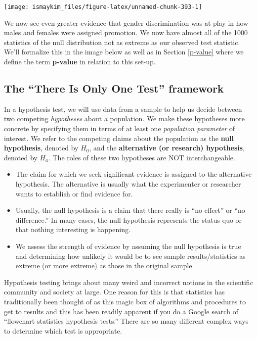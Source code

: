 \documentclass[12pt, krantz2,]{krantz}
\providecommand{\tightlist}{%
  \setlength{\itemsep}{0pt}\setlength{\parskip}{0pt}}
\begin{document}
\begin{center}\texttt{[image: ismaykim\_files/figure-latex/unnamed-chunk-393-1]} \end{center}

We now see even greater evidence that gender discrimination was at play in how males and females were assigned promotion. We now have almost all of the 1000 statistics of the null distribution not as extreme as our observed test statistic. We'll formalize this in the image below as well as in Section \ref{p-value} where we define the term \textbf{p-value} in relation to this set-up.

\hypertarget{only-one-test}{%
\subsection{The ``There Is Only One Test'' framework}\label{only-one-test}}

In a hypothesis test, we will use data from a sample to help us decide between two competing \emph{hypotheses} about a population. We make these hypotheses more concrete by specifying them in terms of at least one \emph{population parameter} of interest. We refer to the competing claims about the population as the \textbf{null hypothesis}, denoted by \(H_0\), and the \textbf{alternative (or research) hypothesis}, denoted by \(H_a\). The roles of these two hypotheses are NOT interchangeable.

\begin{itemize}
\tightlist
\item
  The claim for which we seek significant evidence is assigned to the alternative hypothesis. The alternative is usually what the experimenter or researcher wants to establish or find evidence for.
\item
  Usually, the null hypothesis is a claim that there really is ``no effect'' or ``no difference.'' In many cases, the null hypothesis represents the status quo or that nothing interesting is happening.\\
\item
  We assess the strength of evidence by assuming the null hypothesis is true and determining how unlikely it would be to see sample results/statistics as extreme (or more extreme) as those in the original sample.
\end{itemize}

Hypothesis testing brings about many weird and incorrect notions in the scientific community and society at large. One reason for this is that statistics has traditionally been thought of as this magic box of algorithms and procedures to get to results and this has been readily apparent if you do a Google search of ``flowchart statistics hypothesis tests.'' There are so many different complex ways to determine which test is appropriate.
\end{document}
